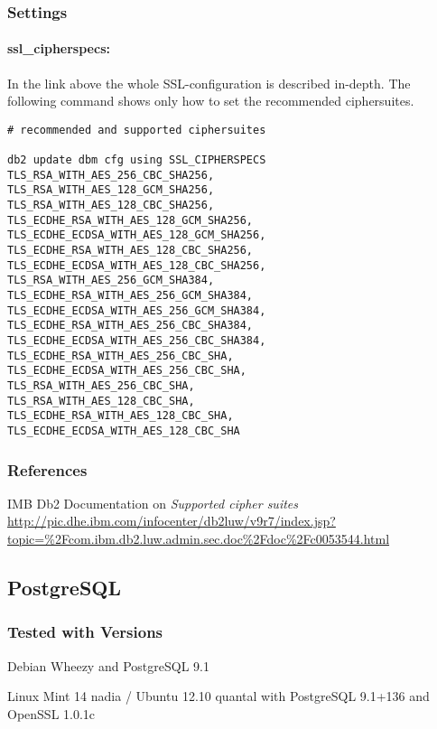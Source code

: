 \subsubsection{Settings}
\paragraph{ssl\_cipherspecs:}
In the link above the whole SSL-configuration is described in-depth. The following command shows only how to set the recommended ciphersuites.
\begin{lstlisting}
# recommended and supported ciphersuites 

db2 update dbm cfg using SSL_CIPHERSPECS 
TLS_RSA_WITH_AES_256_CBC_SHA256,
TLS_RSA_WITH_AES_128_GCM_SHA256,
TLS_RSA_WITH_AES_128_CBC_SHA256,
TLS_ECDHE_RSA_WITH_AES_128_GCM_SHA256,
TLS_ECDHE_ECDSA_WITH_AES_128_GCM_SHA256,
TLS_ECDHE_RSA_WITH_AES_128_CBC_SHA256,
TLS_ECDHE_ECDSA_WITH_AES_128_CBC_SHA256,
TLS_RSA_WITH_AES_256_GCM_SHA384,
TLS_ECDHE_RSA_WITH_AES_256_GCM_SHA384,
TLS_ECDHE_ECDSA_WITH_AES_256_GCM_SHA384,
TLS_ECDHE_RSA_WITH_AES_256_CBC_SHA384,
TLS_ECDHE_ECDSA_WITH_AES_256_CBC_SHA384,
TLS_ECDHE_RSA_WITH_AES_256_CBC_SHA,
TLS_ECDHE_ECDSA_WITH_AES_256_CBC_SHA,
TLS_RSA_WITH_AES_256_CBC_SHA,
TLS_RSA_WITH_AES_128_CBC_SHA,
TLS_ECDHE_RSA_WITH_AES_128_CBC_SHA,
TLS_ECDHE_ECDSA_WITH_AES_128_CBC_SHA
\end{lstlisting}


\subsubsection{References}
\begin{itemize*}
  \item IMB Db2 Documentation on \emph{Supported cipher suites} \url{http://pic.dhe.ibm.com/infocenter/db2luw/v9r7/index.jsp?topic=\%2Fcom.ibm.db2.luw.admin.sec.doc\%2Fdoc\%2Fc0053544.html}
\end{itemize*}


\subsection{PostgreSQL}
\subsubsection{Tested with Versions}
\begin{itemize*}
  \item Debian Wheezy and PostgreSQL 9.1
  \item Linux Mint 14 nadia / Ubuntu 12.10 quantal with PostgreSQL 9.1+136 and OpenSSL 1.0.1c
\end{itemize*}


